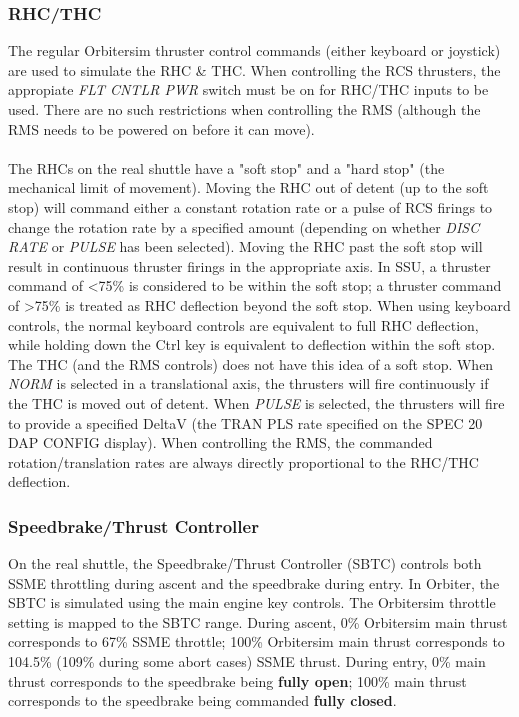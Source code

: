 \documentclass[13pt]{article}
\begin{document}
\begin{multicols}{2}
\subsubsection{\large RHC/THC}
The regular Orbitersim thruster control commands (either keyboard or joystick) are used to simulate the RHC \& THC. When controlling the RCS thrusters, the appropiate \textit{FLT CNTLR PWR} switch must be on for RHC/THC inputs to be used. There are no such restrictions when controlling the RMS (although the RMS needs to be powered on before it can move).
\\
\\
The RHCs on the real shuttle have a "soft stop" and a "hard stop" (the mechanical limit of movement). Moving the RHC out of detent (up to the soft stop) will command either a constant rotation rate or a pulse of RCS firings to change the rotation rate by a specified amount (depending on whether \textit{DISC RATE} or \textit{PULSE} has been selected). Moving the RHC past the soft stop will result in continuous thruster firings in the appropriate axis. In SSU, a thruster command of <75\% is considered to be within the soft stop; a thruster command of >75\% is treated as RHC deflection beyond the soft stop. When using keyboard controls, the normal keyboard controls are equivalent to full RHC deflection, while holding down the Ctrl key is equivalent to deflection within the soft stop. The THC (and the RMS controls) does not have this idea of a soft stop. When \textit{NORM} is selected in a translational axis, the thrusters will fire continuously if the THC is moved out of detent. When \textit{PULSE} is selected, the thrusters will fire to provide a specified DeltaV (the TRAN PLS rate specified on the SPEC 20 DAP CONFIG display). When controlling the RMS, the commanded rotation/translation rates are always directly proportional to the RHC/THC deflection.

\subsubsection{\large Speedbrake/Thrust Controller}
On the real shuttle, the Speedbrake/Thrust Controller (SBTC) controls both SSME throttling during ascent and the speedbrake during entry. In Orbiter, the SBTC is simulated using the main engine key controls. The Orbitersim throttle setting is mapped to the SBTC range. During ascent, 0\% Orbitersim main thrust corresponds to 67\% SSME throttle; 100\% Orbitersim main thrust corresponds to 104.5\% (109\% during some abort cases) SSME thrust. During entry, 0\% main thrust corresponds to the speedbrake being \textbf{fully open}; 100\% main thrust corresponds to the speedbrake being commanded \textbf{fully closed}.


\end{multicols}
\end{document}
